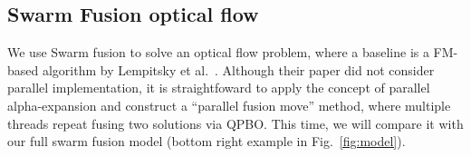 \subsection{Swarm Fusion optical flow}

We use Swarm fusion to solve an optical flow problem, where a baseline
is a FM-based algorithm by Lempitsky et al.~\cite{viktor_optical_flow}.
Although their paper did not consider parallel implementation, it is
straightfoward to apply the concept of parallel alpha-expansion and
construct a ``parallel fusion move'' method, where multiple threads
repeat fusing two solutions via QPBO. This time, we will compare it with
our full swarm fusion model (bottom right example in
Fig.~\ref{fig:model}).





